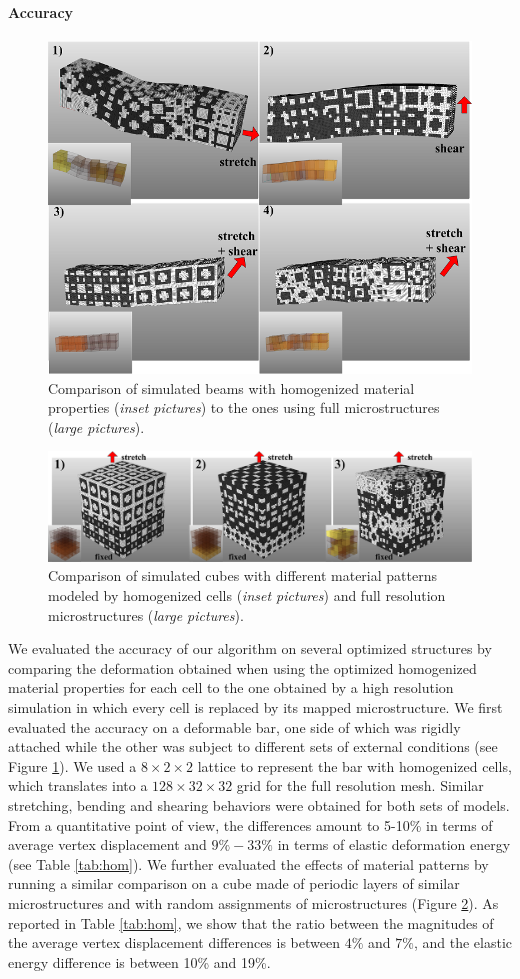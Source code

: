 \paragraph{Accuracy}
\begin{figure}
	\centering
	\includegraphics[width=.6\linewidth]{images/hom_beam.png}	
	\caption{Comparison of simulated beams with homogenized material properties (\emph{inset pictures}) to the ones using full microstructures (\emph{large pictures}).
		}\label{fig:hom_beam}
\end{figure}

\begin{figure}[h]
	\centering
	\includegraphics[width=.8\linewidth]{images/hom_cube_random.png}	
	\caption{Comparison of simulated cubes with different material patterns modeled by homogenized cells (\emph{inset pictures}) and full resolution microstructures (\emph{large pictures}).}
		\label{fig:hom_cube_2}
\end{figure}

We evaluated the accuracy of our algorithm on several optimized structures by comparing the deformation obtained when using the optimized homogenized material properties for each cell to the one obtained by a high resolution simulation in which every cell is replaced by its mapped microstructure.
We first evaluated the accuracy on a deformable bar, one side of which was rigidly attached while the other was subject to different sets of external conditions (see Figure \ref{fig:hom_beam}). We used a $8\times2\times2$ lattice to represent the bar with homogenized cells, which translates into a $128\times32\times32$ grid for the full resolution mesh. Similar stretching, bending and shearing behaviors were obtained for both sets of models. From a quantitative point of view, the differences amount to 5-10\% in terms of average vertex displacement and $9\%-33\%$ in terms of elastic deformation energy (see Table \ref{tab:hom}). We further evaluated the effects of material patterns by running a similar comparison on a cube made of periodic layers of similar microstructures and with random assignments of microstructures (Figure \ref{fig:hom_cube_2}).  As reported in Table \ref{tab:hom}, we show that the ratio between the magnitudes of the average vertex displacement differences is between $4\%$ and $7\%$, and the elastic energy difference is between 10\% and 19\%.

